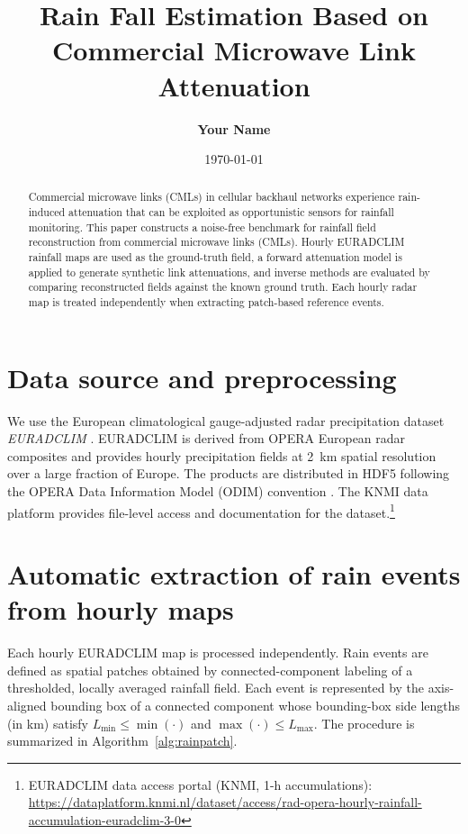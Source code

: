\documentclass[11pt]{article}
\title{Rain Fall Estimation Based on Commercial Microwave Link Attenuation}
\author{\textbf{Your Name}}
\affil{Your Institution}
\date{\today}
\begin{document}
\maketitle

\begin{abstract}
Commercial microwave links (CMLs) in cellular backhaul networks experience rain-induced attenuation that can be exploited as opportunistic sensors for rainfall monitoring. This paper constructs a noise-free benchmark for rainfall field reconstruction from commercial microwave links (CMLs). Hourly EURADCLIM rainfall maps are used as the ground-truth field, a forward attenuation model is applied to generate synthetic link attenuations, and inverse methods are evaluated by comparing reconstructed fields against the known ground truth. Each hourly radar map is treated independently when extracting patch-based reference events.
\end{abstract}

\section{Data source and preprocessing}
We use the European climatological gauge-adjusted radar precipitation dataset \emph{EURADCLIM} \cite{overeem2023euradclim}. EURADCLIM is derived from OPERA European radar composites and provides hourly precipitation fields at \SI{2}{km} spatial resolution over a large fraction of Europe. The products are distributed in HDF5 following the OPERA Data Information Model (ODIM) convention \cite{odimh5}. The KNMI data platform provides file-level access and documentation for the dataset.\footnote{EURADCLIM data access portal (KNMI, 1-h accumulations): \url{https://dataplatform.knmi.nl/dataset/access/rad-opera-hourly-rainfall-accumulation-euradclim-3-0}}


\section{Automatic extraction of rain events from hourly maps}
Each hourly EURADCLIM map is processed independently. Rain events are defined as spatial patches obtained by connected-component labeling of a thresholded, locally averaged rainfall field. Each event is represented by the axis-aligned bounding box of a connected component whose bounding-box side lengths (in km) satisfy $L_{\min}\le \min(\cdot)$ and $\max(\cdot)\le L_{\max}$. The procedure is summarized in Algorithm~\ref{alg:rainpatch}.
\end{document}
